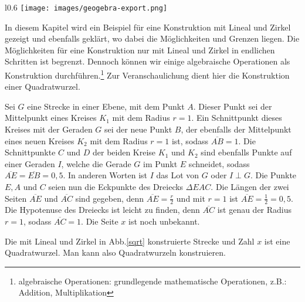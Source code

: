 \begin{wrapfigure}{l}{0.6\textwidth}
    \centering
    \texttt{[image: images/geogebra-export.png]}
    \caption{Konstruktion einer Quadratwurzel}\label{sqrt}
\end{wrapfigure}
In diesem Kapitel wird ein Beispiel für eine Konstruktion mit Lineal und Zirkel gezeigt und ebenfalls geklärt, wo dabei die Möglichkeiten und Grenzen liegen. Die Möglichkeiten für eine Konstruktion nur mit Lineal und Zirkel in endlichen Schritten ist begrenzt. Dennoch können wir einige algebraische Operationen als Konstruktion durchführen.\footnote{algebraische Operationen: grundlegende mathematische Operationen, z.B.: Addition, Multiplikation}  Zur Veranschaulichung dient hier die Konstruktion einer Quadratwurzel.\newline \par Sei $G$ eine Strecke in einer Ebene, mit dem Punkt $A$. Dieser Punkt sei der Mittelpunkt eines Kreises $K_1$ mit dem Radius $r=1$. Ein Schnittpunkt dieses Kreises mit der Geraden $G$ sei der neue Punkt $B$, der ebenfalls der Mittelpunkt eines neuen Kreises $K_2$ mit dem Radius $r=1$ ist, sodass $\overline{AB}=1$. Die Schnittpunkte $C$ und $D$ der beiden Kreise $K_1$ und $K_2$  sind ebenfalls Punkte auf einer Geraden $I$, welche die Gerade $G$ im Punkt $E$ schneidet, sodass \(\overline{AE}=\overline{EB}=0,5\). In anderen Worten ist $I$ das Lot von $G$ oder $I \perp G$. Die Punkte $E,A$ und $C$ seien nun die Eckpunkte des Dreiecks $\Delta EAC$. Die Längen der zwei Seiten $\overline{AE}$ und $\overline{AC}$ sind gegeben, denn $\overline{AE}=\frac{r}{2}$ und mit $r=1$ ist $\overline{AE}=\frac{1}{2}=0,5$. Die Hypotenuse des Dreiecks ist leicht zu finden, denn $\overline{AC}$ ist genau der Radius $r=1$, sodass $\overline{AC}=1$. Die Seite $x$ ist noch unbekannt. \begin{theorem}
Die mit Lineal und Zirkel in Abb.\ref{sqrt} konstruierte Strecke und Zahl $x$ ist eine Quadratwurzel. Man kann also Quadratwurzeln konstruieren.
\end{theorem}
